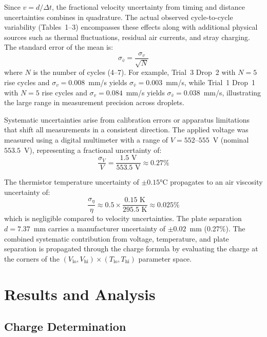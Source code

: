 \documentclass[11pt]{article}
\begin{document}
Since $v = d / \Delta t$, the fractional velocity uncertainty from timing and distance uncertainties combines in quadrature. The actual observed cycle-to-cycle variability (Tables~1--3) encompasses these effects along with additional physical sources such as thermal fluctuations, residual air currents, and stray charging. The standard error of the mean is:
\begin{equation}
\sigma_{\bar{v}} = \frac{\sigma_v}{\sqrt{N}}
\end{equation}
where $N$ is the number of cycles (4--7). For example, Trial~3 Drop~2 with $N = 5$ rise cycles and $\sigma_v = 0.008$~mm/s yields $\sigma_{\bar{v}} = 0.003$~mm/s, while Trial~1 Drop~1 with $N = 5$ rise cycles and $\sigma_v = 0.084$~mm/s yields $\sigma_{\bar{v}} = 0.038$~mm/s, illustrating the large range in measurement precision across droplets.

Systematic uncertainties arise from calibration errors or apparatus limitations that shift all measurements in a consistent direction. The applied voltage was measured using a digital multimeter with a range of $V = 552$--$555$~V (nominal $553.5$~V), representing a fractional uncertainty of:
\begin{equation}
\frac{\sigma_V}{V} = \frac{1.5 \text{ V}}{553.5 \text{ V}} \approx 0.27\%
\end{equation}

The thermistor temperature uncertainty of $\pm 0.15$°C propagates to an air viscosity uncertainty of:
\begin{equation}
\frac{\sigma_\eta}{\eta} \approx 0.5 \times \frac{0.15 \text{ K}}{295.5 \text{ K}} \approx 0.025\%
\end{equation}
which is negligible compared to velocity uncertainties. The plate separation $d = 7.37$~mm carries a manufacturer uncertainty of $\pm 0.02$~mm (0.27\%). The combined systematic contribution from voltage, temperature, and plate separation is propagated through the charge formula by evaluating the charge at the corners of the $(V_{\text{lo}}, V_{\text{hi}}) \times (T_{\text{lo}}, T_{\text{hi}})$ parameter space.

\section{Results and Analysis}

\subsection{Charge Determination}
\end{document}

